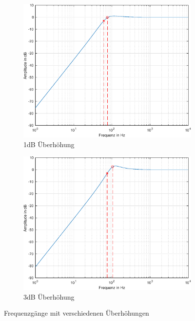 \begin{figure}[H]
    \centering
    
    \begin{subfigure}{.49\textwidth}
        \centering
        \includegraphics[width=0.85\linewidth]{Figures/Frequenzgang_1dB.eps}
        \caption{1dB Überhöhung}
        \label{Frequenzgang_1dB}
    \end{subfigure}
    \begin{subfigure}{.49\textwidth}
        \centering
        \includegraphics[width=0.85\linewidth]{Figures/Frequenzgang_3dB.eps}
        \caption{3dB Überhöhung}
        \label{Frequenzgang_3dB}
    \end{subfigure}
    
    \caption{Frequenzgänge mit verschiedenen Überhöhungen}
    \label{fig:Ueberhoehung}
\end{figure}